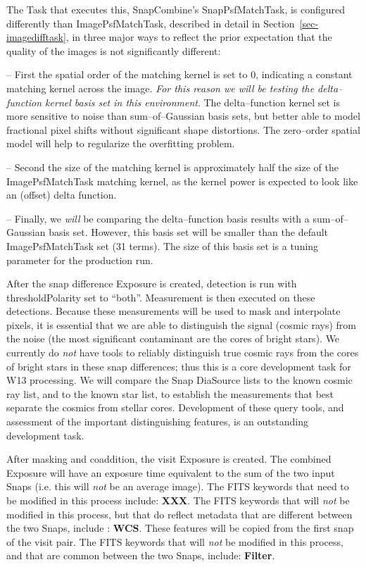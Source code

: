 \documentclass[12pt]{article}
\begin{document}
The Task that executes this, SnapCombine's SnapPsfMatchTask, is
configured differently than ImagePsfMatchTask, described in detail in
Section~\ref{sec-imagedifftask}, in three major ways to reflect the
prior expectation that the quality of the images is not significantly
different:

-- First the spatial order of the matching kernel is set to 0,
indicating a constant matching kernel across the image.  {\it For this
  reason we will be testing the delta--function kernel basis set in
  this environment}.  The delta--function kernel set is more sensitive
to noise than sum--of--Gaussian basis sets, but better able to model
fractional pixel shifts without significant shape distortions.  The
zero--order spatial model will help to regularize the overfitting
problem.

-- Second the size of the matching kernel is approximately half the
size of the ImagePsfMatchTask matching kernel, as the kernel power is
expected to look like an (offset) delta function.

-- Finally, we {\it will} be comparing the delta--function basis
results with a sum--of--Gaussian basis set.  However, this basis set
will be smaller than the default ImagePsfMatchTask set (31 terms).
The size of this basis set is a tuning parameter for the production
run.

After the snap difference Exposure is created, detection is run with
thresholdPolarity set to ``both''.  Measurement is then executed on
these detections.  Because these measurements will be used to mask and
interpolate pixels, it is essential that we are able to distinguish
the signal (cosmic rays) from the noise (the most significant
contaminant are the cores of bright stars).  We currently do {\it not}
have tools to reliably distinguish true cosmic rays from the cores of
bright stars in these snap differences; thus this is a core
development task for W13 processing.  We will compare the Snap
DiaSource lists to the known cosmic ray list, and to the known star
list, to establish the measurements that best separate the cosmics
from stellar cores.  Development of these query tools, and assessment
of the important distinguishing features, is an outstanding
development task.

After masking and coaddition, the visit Exposure is created.  The
combined Exposure will have an exposure time equivalent to the sum of
the two input Snaps (i.e. this will {\it not} be an average image).
The FITS keywords that need to be modified in this process include:
{\bf XXX}.  The FITS keywords that will {\it not} be modified in this
process, but that do reflect metadata that are different between the
two Snaps, include : {\bf WCS}.  These features will be copied from
the first snap of the visit pair.  The FITS keywords that will {\it
  not} be modified in this process, and that are common between the
two Snaps, include: {\bf Filter}.
\end{document}
